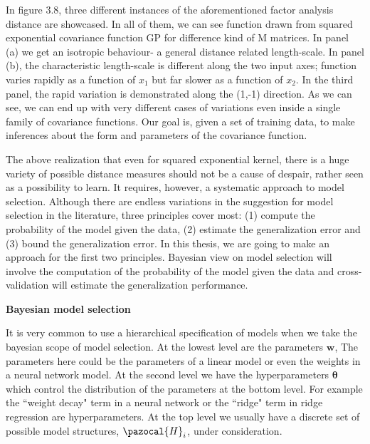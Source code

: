 \documentclass[12pt,a4paper,oneside]{book}
\theoremstyle{plain}
\theoremstyle{definition}
\begin{document}
{\vspace{3mm}
\noindent
In figure 3.8, three different instances of the aforementioned factor analysis distance are showcased. In all of them, we can see function drawn from squared exponential covariance function GP for difference kind of M matrices. In panel (a) we get an isotropic behaviour- a general distance related length-scale. In panel (b), the characteristic length-scale is different along the two input axes; function varies rapidly as a function of $x_1$ but far slower as a function of $x_2$. In the third panel, the rapid variation is demonstrated along the (1,-1) direction. As we can see, we can end up with very different cases of variations even inside a single family of covariance functions. Our goal is, given a set of training data, to make inferences about the form and parameters of the covariance function. 

\vspace{3mm}
\noindent
The above realization that even for squared exponential kernel, there is a huge variety of possible distance measures should not be a cause of despair, rather seen as a possibility to learn. It requires, however, a systematic approach to model selection. Although there are endless variations in the suggestion for model selection in the literature, three principles cover most: (1) compute the probability of the model given the data, (2) estimate the generalization error and (3) bound the generalization error. In this thesis, we are going to make an approach for the first two principles. Bayesian view on model selection will involve the computation of the probability of the model given the data and cross-validation will estimate the generalization performance.
\vspace{3mm}
\begin{flushleft}
\textbf{Bayesian model selection}
\end{flushleft}
\vspace{3mm}
It is very common to use a hierarchical specification of models when we take the bayesian scope of model selection. At the lowest level are the parameters $\bm{w}$, The parameters here could be the parameters of a linear model or even the weights in a neural network model. At the second level we have the hyperparameters $\bm{\theta}$ which control the distribution of the parameters at the bottom level. For example the ``weight decay" term in a neural network or the ``ridge" term in ridge regression are hyperparameters. At the top level we usually have a discrete set of possible model structures, $\pazocal{H}_i$, under consideration. 

}
\end{document}

